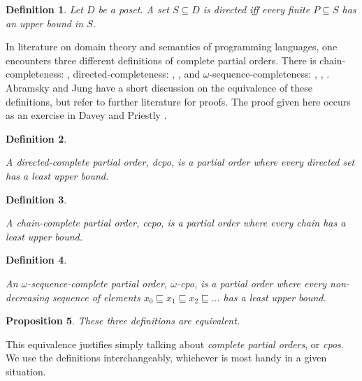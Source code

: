 \documentclass[a4paper]{article}
\newcommand{\below}{\sqsubseteq}
\newtheorem{definition}{Definition}[section]
\newtheorem{proposition}[definition]{Proposition}
\begin{document}
\begin{definition}

Let $D$ be a poset. A set $S \subseteq D$ is \emph{directed} iff every finite
$P \subseteq S$ has an upper bound in $S$.

\end{definition}


In literature on domain theory and semantics of programming languages, one
encounters three different definitions of complete partial orders.  There is
chain-completeness: \cite{Moschovakis1994}, directed-completeness:
\cite{DaveyPriestly1990}, \cite{Gunter1992}, and $\omega$-sequence-completeness:
\cite{Allison1986}, \cite{Winskel1993}, \cite{BarrWells1990}. Abramsky and Jung
\cite{Abramsky1994} have a short discussion on the equivalence of these
definitions, but refer to further literature for proofs. The proof given here
occurs as an exercise in Davey and Priestly \cite{DaveyPriestly1990}.


\begin{definition} \label{defCpoDirectedComplete}

A directed-complete partial order, \emph{dcpo}, is a partial order where every
directed set has a least upper bound.

\end{definition}


\begin{definition} \label{defCpoChainComplete}

A chain-complete partial order, \emph{ccpo}, is a partial order where every chain
has a least upper bound.

\end{definition}


\begin{definition} \label{defCpoOmegaSequenceComplete}

An $\omega$-sequence-complete partial order, \emph{$\omega$-cpo}, is a partial
order where every non-decreasing sequence of elements $x_0 \below x_1 \below x_2
\below \ldots $ has a least upper bound.

\end{definition}


\begin{proposition}

These three definitions are equivalent.

\end{proposition}

This equivalence justifies simply talking about \emph{complete partial orders},
or \emph{cpos}. We use the definitions interchangeably, whichever is most handy
in a given situation.
\end{document}

